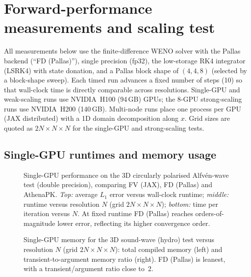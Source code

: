 %
\section{Forward-performance measurements and scaling test}

All measurements below use the finite-difference WENO solver with the
Pallas backend (``FD (Pallas)''), single precision (fp32), the low-storage
RK4 integrator (LSRK4) with state donation, and a Pallas block shape of
$(4,4,8)$ (selected by a block-shape sweep). Each timed run advances a
fixed number of steps (10) so that wall-clock time is directly comparable
across resolutions. Single-GPU and weak-scaling runs use NVIDIA~H100
(94\,GB) GPUs; the 8-GPU strong-scaling runs use NVIDIA~H200 (140\,GB).
Multi-node runs place one process per GPU (JAX distributed) with a 1D
domain decomposition along $x$. Grid sizes are quoted as $2N\times N\times N$
for the single-GPU and strong-scaling tests.

\subsection{Single-GPU runtimes and memory usage}

\begin{figure}
    \centering
    
    \caption{Single-GPU performance on the 3D circularly polarised
    Alfv\'en-wave test (double precision), comparing FV (JAX), FD (Pallas)
    and AthenaPK. \emph{Top:} average $L_1$ error versus wall-clock
    runtime; \emph{middle:} runtime versus resolution $N$ (grid
    $2N\times N\times N$); \emph{bottom:} time per iteration versus $N$.
    At fixed runtime FD (Pallas) reaches orders-of-magnitude lower error,
    reflecting its higher convergence order.}
    \label{fig:sg_runtime}
\end{figure}

\begin{figure}
    \centering
    
    \caption{Single-GPU memory for the 3D sound-wave (hydro) test versus
    resolution $N$ (grid $2N\times N\times N$): total compiled memory
    (left) and transient-to-argument memory ratio (right). FD (Pallas) is
    leanest, with a transient/argument ratio close to~2.}
    \label{fig:sg_mem_hydro}
\end{figure}

